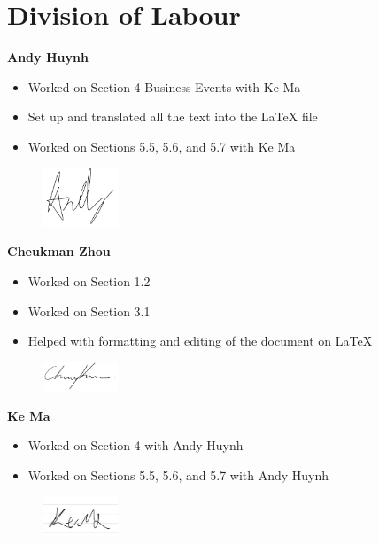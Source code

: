 \appendix
\section{Division of Labour}
\label{sec:division_of_labour}

\textbf{Andy Huynh}
\begin{itemize}
    \item Worked on Section 4 Business Events with Ke Ma
    \item Set up and translated all the text into the LaTeX file
    \item Worked on Sections 5.5, 5.6, and 5.7 with Ke Ma
\end{itemize}
\begin{figure}[H]
	\centering
	\includegraphics[width=0.2\textwidth]{Signatures/a.png}  
\end{figure}

\textbf{Cheukman Zhou}
\begin{itemize}
    \item Worked on Section 1.2
    \item Worked on Section 3.1
    \item Helped with formatting and editing of the document on LaTeX
\end{itemize}
\begin{figure}[H]
	\centering
	\includegraphics[width=0.2\textwidth]{Signatures/c.png}
\end{figure}

\textbf{Ke Ma}
\begin{itemize}
    \item Worked on Section 4 with Andy Huynh
    \item Worked on Sections 5.5, 5.6, and 5.7 with Andy Huynh
\end{itemize}
\begin{figure}[H]
	\centering
	\includegraphics[width=0.2\textwidth]{Signatures/k.png}
\end{figure}

